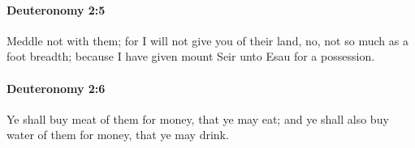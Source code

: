 		\paragraph{Deuteronomy 2:5} %
			\label{DEUTERONOMY-2-5}

			Meddle not with them; for I will not give you of their land, no, not so much as a foot breadth; because I have given mount Seir unto Esau for a possession.


		\paragraph{Deuteronomy 2:6} %
			\label{DEUTERONOMY-2-6}

			Ye shall buy meat of them for money, that ye may eat; and ye shall also buy water of them for money, that ye may drink.


